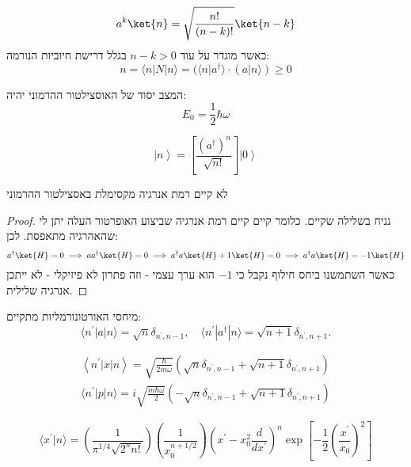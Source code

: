 \documentclass{tstextbook}
\begin{document}
\begin{proposition}
$$a^k\ket{n} =\sqrt{ \frac{n!}{(n-k)!} }\ket{n-k} $$
כאשר מוגדר על עוד \(n-k>0\) בגלל דרישת חיוביות הנורמה:
$$n=\langle n|N|n\rangle=(\langle n|a^{\dagger}\rangle\cdot(a|n\rangle)\geq0$$

\end{proposition}
\begin{corollary}
המצב יסוד של האוסצילטור ההרמוני יהיה:
$$E_{0}={\frac{1}{2}}\hbar\omega$$

\end{corollary}
\begin{corollary}
$$\left|n\right\rangle=\left[\frac{(a^{\dagger})^{n}}{\sqrt{n!}}\right]\left|0\right\rangle$$

\end{corollary}
\begin{proposition}
לא קיים רמת אנרגיה מקסימלת באסצילטור ההרמוני

\end{proposition}
\begin{proof}
נניח בשלילה שקיים. כלומר קיים קיים רמת אנרגיה שביצוע האופרטור העלה יתן לי שהאהרגיה מתאפסת. לכן:
$$a^{\dagger}\ket{H} =0\implies aa^{\dagger}\ket{H} =0\implies a^{\dagger}a\ket{H} +1\ket{H} =0\implies a^{\dagger}a\ket{H} =-1\ket{H} $$
כאשר השתמשנו ביחס חילוף נקבל כי \(-1\) הוא ערך עצמי - וזה פתרון לא פיזיקלי - לא ייתכן אנרגיה שלילית.

\end{proof}
\begin{proposition}
מיחסי האורטונורמליות מתקיים:
$$\langle n^{\prime}|a|n\rangle=\sqrt{n}\delta_{n^{\prime},n-1},\quad\langle n^{\prime}|a^{\dagger}|n\rangle=\sqrt{n+1}\delta_{n^{\prime},n+1}.$$

\end{proposition}
\begin{proposition}
\begin{gather*}\left\langle  n^{\prime}|x|n \right\rangle=\sqrt{\frac{\hbar}{2m\omega}}\left( \sqrt{n}\delta_{n^{\prime},n-1}+\sqrt{n+1}\delta_{n^{\prime},n+1} \right)  \\\langle n^{\prime}|p|n\rangle=i\sqrt{\frac{m\hbar\omega}{2}}(-\sqrt{n}\delta_{n^{\prime},n-1}+\sqrt{n+1}\delta_{n^{\prime},n+1})
\end{gather*}

\end{proposition}
\begin{proposition}
$$\langle x^{\prime}|n\rangle=\left(\frac{1}{\pi^{1/4}\sqrt{2^{n}n!}}\right)\left(\frac{1}{x_{0}^{n+1/2}}\right)\left(x^{\prime}-x_{0}^{2}\frac{d}{d x^{\prime}}\right)^{n}\exp{\left[-\frac{1}{2}\left(\frac{x^{\prime}}{x_{0}}\right)^{2}\right]}$$

\end{proposition}
\end{document}
